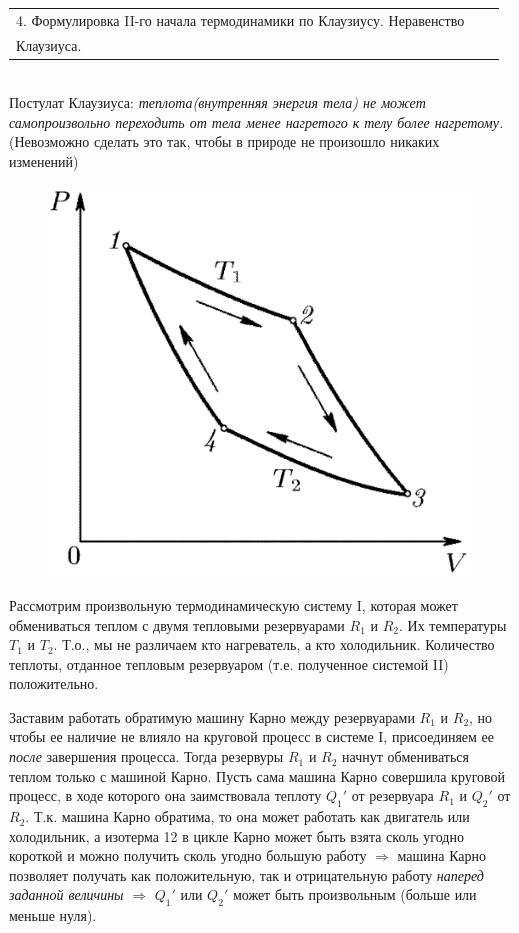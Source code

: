 \documentclass[14pt,a4paper]{scrartcl}
\begin{document}
		
		\begin{tabular}[t]{|l|ll|} 
			\hline
			4. Формулировка II-го начала термодинамики по Клаузиусу. Неравенство \\Клаузиуса.
\\
			\hline
		\end{tabular}\\
	
	\quad Постулат Клаузиуса: \textit{теплота(внутренняя энергия тела) не может самопроизвольно переходить от тела менее нагретого к телу более нагретому.} (Невозможно сделать это так, чтобы в природе не произошло никаких изменений)\\
	
	\begin{figure} 
		\vspace{-5ex}
		\includegraphics[width=\linewidth]{karno.png}
	\end{figure}
	\quad Рассмотрим произвольную термодинамическую систему I, которая может обмениваться теплом с двумя тепловыми резервуарами $R_1$ и $R_2$. Их температуры $T_1$ и $T_2$. Т.о., мы не различаем кто нагреватель, а кто холодильник. Количество теплоты, отданное тепловым резервуаром (т.е. полученное системой II) положительно.
	
	\quad Заставим работать обратимую машину Карно между резервуарами $R_1$ и $R_2$, но чтобы ее наличие не влияло на круговой процесс в системе I, присоединяем ее \textit{после} завершения процесса. Тогда резервуры $R_1$ и $R_2$ начнут обмениваться теплом только с машиной Карно. Пусть сама машина Карно совершила круговой процесс, в ходе которого она заимствовала теплоту $Q_1'$ от резервуара $R_1$ и $Q_2'$ от $R_2$. Т.к. машина Карно обратима, то она может работать как двигатель или холодильник, а изотерма 12 в цикле Карно может быть взята сколь угодно короткой и можно получить сколь угодно большую работу $\Rightarrow$ машина Карно позволяет получать как положительную, так и отрицательную работу \textit{наперед заданной величины} $\Rightarrow$ $Q_1'$ или $Q_2'$ может быть произвольным (больше или меньше нуля). 
	
\end{document}
